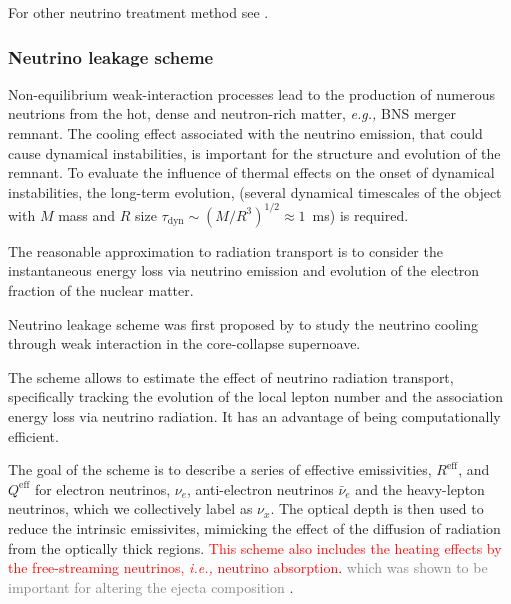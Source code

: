 \documentclass[11pt,a4paper,headinclude=true,DIV=14,BCOR=8mm,chapterprefix,listof=totoc,twoside,openright,abstracton]{scrbook}
\newcommand{\red}[1]{\textcolor{red}{#1}}
\newcommand{\gray}[1]{\textcolor{gray}{#1}}
\begin{document}
For other neutrino treatment method see \cite{vanRiper:1981mko,Ruffert:1995fs,Rosswog:2003rv,OConnor:2009iuz,Sekiguchi:2010ep,Neilsen:2014hha,Perego:2015agy,Ardevol-Pulpillo:2018btx}.


\subsubsection{Neutrino leakage scheme}



Non-equilibrium weak-interaction processes lead to the production of numerous neutrions from the hot, dense and neutron-rich matter, \textit{e.g.,} BNS merger remnant. The cooling effect associated with the neutrino emission, that could cause dynamical instabilities, is important for the structure and evolution of the remnant. 
To evaluate the influence of thermal effects on the onset of dynamical instabilities, the long-term evolution, (several dynamical timescales of the object with $M$ mass and $R$ size $\tau_{\text{dyn}}\sim(M/R^3)^{1/2}\approx 1$~ms) is required.

The reasonable approximation to radiation transport is to consider the instantaneous energy loss via neutrino emission and evolution of the electron fraction of the nuclear matter.

Neutrino leakage scheme was first proposed by \cite{vanRiper:1981mko} to study the neutrino cooling through weak interaction in the core-collapse supernoave.

The scheme allows to estimate the effect of neutrino radiation transport, specifically tracking the evolution of the local lepton number and the association energy loss via neutrino radiation.
It has an advantage of being computationally efficient.

The goal of the scheme is to describe a series of effective emissivities, $R^{\text{eff}}$, and $Q^{\text{eff}}$ for electron neutrinos, $\nu_e$, anti-electron neutrinos $\bar{\nu}_e$ and the heavy-lepton neutrinos, which we collectively label as $\nu_x$.
The optical depth is then used to reduce the intrinsic emissivites, mimicking the effect of the diffusion of radiation from the optically thick regions.
\red{This scheme also includes the heating effects by the free-streaming neutrinos, \textit{i.e.,} neutrino absorption}. \gray{ which was shown to be important for altering the ejecta composition }.
\end{document}
